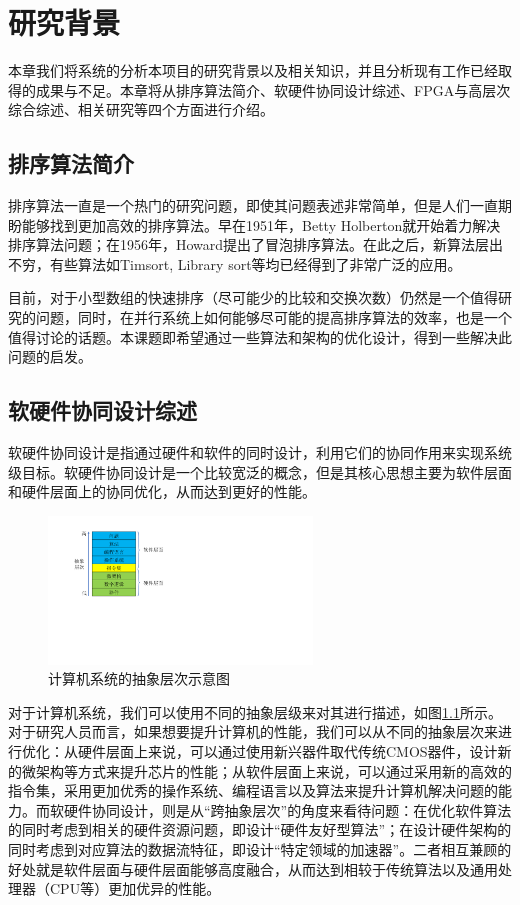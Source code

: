 
\chapter{研究背景}
本章我们将系统的分析本项目的研究背景以及相关知识，并且分析现有工作已经取得的成果与不足。本章将从排序算法简介、软硬件协同设计综述、FPGA与高层次综合综述、相关研究等四个方面进行介绍。
\section{排序算法简介}

排序算法一直是一个热门的研究问题，即使其问题表述非常简单，但是人们一直期盼能够找到更加高效的排序算法。早在1951年，Betty Holberton就开始着力解决排序算法问题；在1956年，Howard提出了冒泡排序算法\cite{demuth1956report}。在此之后，新算法层出不穷，有些算法如Timsort\cite{mcilroy1993optimistic}, Library sort\cite{bender2006insertion}等均已经得到了非常广泛的应用。

目前，对于小型数组的快速排序（尽可能少的比较和交换次数）仍然是一个值得研究的问题，同时，在并行系统上如何能够尽可能的提高排序算法的效率，也是一个值得讨论的话题。本课题即希望通过一些算法和架构的优化设计，得到一些解决此问题的启发。


\section{软硬件协同设计综述}
软硬件协同设计是指通过硬件和软件的同时设计，利用它们的协同作用来实现系统级目标\cite{de1997hardware}。软硬件协同设计是一个比较宽泛的概念，但是其核心思想主要为软件层面和硬件层面上的协同优化，从而达到更好的性能。

\begin{figure}[htbp]
    \centering
    \includegraphics[width=7cm]{figures/computer_system_abstract.pdf}
    \caption{计算机系统的抽象层次示意图}
    \label{fig:computer_system_abstract}
\end{figure}
对于计算机系统，我们可以使用不同的抽象层级来对其进行描述，如图\ref{fig:computer_system_abstract}所示。对于研究人员而言，如果想要提升计算机的性能，我们可以从不同的抽象层次来进行优化：从硬件层面上来说，可以通过使用新兴器件取代传统CMOS器件，设计新的微架构等方式来提升芯片的性能；从软件层面上来说，可以通过采用新的高效的指令集，采用更加优秀的操作系统、编程语言以及算法来提升计算机解决问题的能力。而软硬件协同设计，则是从“跨抽象层次”的角度来看待问题：在优化软件算法的同时考虑到相关的硬件资源问题，即设计“硬件友好型算法”；在设计硬件架构的同时考虑到对应算法的数据流特征，即设计“特定领域的加速器”。二者相互兼顾的好处就是软件层面与硬件层面能够高度融合，从而达到相较于传统算法以及通用处理器（CPU等）更加优异的性能。


